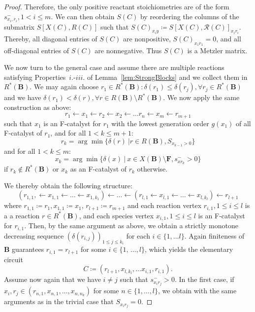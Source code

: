 \documentclass[pdflatex]{sn-jnl}
\theoremstyle{thmstyleone}%
\theoremstyle{examplesty}%
\theoremstyle{thmstylethree}%
\newcommand{\food}{\ensuremath{\mathbf{F}}}
\newcommand{\SM}{S}
\newcommand{\CR}[0]{\mathcal{R}}
\newcommand{\block}[0]{\mathbf{B}}
\newcommand{\sgen}{g}
\newcommand{\crgen}{\delta}
\begin{document}
\begin{proof}
{	Therefore, the only positive reactant stoichiometries are of the form $s^-_{x_i,r_i}, 1<i\leq m$. We can then obtain $S(C)$ by reordering the columns of the submatrix $\SM[X(C), R(C)]$ such that $S(C)_{x_iy}\coloneqq \SM[X(C), \CR(C)]_{x_ir_i}$. Thereby, all diagonal entries of $\SM(C)$ are nonpositive, $\SM(C)_{x_1r_1}=0$, and all off-diagonal entries of $\SM(C)$ are nonnegative. Thus $\SM(C)$ is a Metzler matrix.
	\vspace{6pt}

	We now turn to the general case and assume there are multiple
	reactions satisfying Properties~$i.$-$iii.$ of Lemma~\ref{lem:StrongBlocks} and we collect them in $R^*(\block)$. We may again choose $r_1\in R^*(\block):
	\crgen(r_1)\leq \crgen(r_j), \forall r_j\in R^*(\block)$ and we have $\crgen(r_1)<\crgen(r), \forall r\in R(\block)\setminus R^*(\block)$. We now apply the same construction as above:
	\begin{equation}
		r_1 \leftarrow x_1 \leftarrow r_2 \leftarrow x_2 \leftarrow \ldots r_n \leftarrow x_m \leftarrow r_{m+1}
	\end{equation}
	such that $x_1$ is an F-catalyst for $r_1$ with the lowest generation order $\sgen(x_1)$ of all F-catalyst of $r_1$, and for all $1< k\leq m+1$:
	\begin{equation}
		r_k = \arg \min \{ \crgen(r) \ | r\in R(\block), \SM_{x_{k-1}>0}\}
	\end{equation}
	and for all $1<k\leq m$:
	\begin{equation}
		x_k = \arg \min \{\delta (x) \ \vert \ x\in X(\block)\setminus\food, s^-_{xr_k}>0\}
	\end{equation}
	if $r_k \notin R^*(\block)$ or $x_k$ as an F-catalyst of $r_k$ otherwise. 
	
	We thereby obtain the following structure:
	\begin{equation*}
		(r_{1,1}, \leftarrow x_{1,1} \leftarrow\ldots \leftarrow x_{1,k_1})
		\leftarrow \ldots \leftarrow (r_{l,1} \leftarrow x_{l,1} \leftarrow
		\ldots \leftarrow x_{l,k_l}) \leftarrow r_{l+1}
	\end{equation*}
	where $r_{1,1} \coloneqq r_1, x_{1,1} \coloneqq x_1$, $r_{l+1}\coloneqq r_{m+1}$ and each reaction vertex $r_{i,1}, 1\leq i\leq l$ is a a reaction $r\in R^*(\block)$, and each species vertex $x_{i,1}, 1\leq i\leq l$ is an F-catalyst for $r_{i,1}$. Then, by the same argument as above, we obtain a strictly monotone decreasing sequence $(\delta(r_{i,j}))_{1\leq j \leq k_i}$ for each $i\in \{1,\ldots l\}$. Again finiteness of $\block$ guarantees 
	$r_{i,1}=r_{l+1}$ for some $i\in \{1,\,\ldots, l\}$, which yields the elementary circuit
	\begin{equation}
		C\coloneqq (r_{l+1}, x_{l,k_l}, \ldots x_{i,1},  r_{i,1}).
	\end{equation}
	Assume now again that we have $i\neq j$ such that $s^-_{x_ir_j}>0$. In the first case, if $x_i, r_j\in (r_{n,1},x_{n,1},\ldots, x_{n,n_k})$ for some $n\in \{1,\ldots, l\}$, we obtain with the same arguments as in the trivial case that $S_{x_ir_j}=0$.

}
\end{proof}
\end{document}
